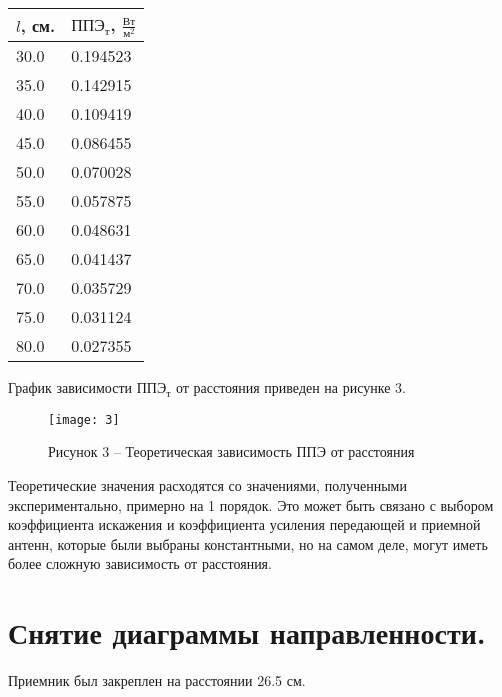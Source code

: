 \begin{longtable}{|p{7.5cm}|p{7.5cm}|}
    \hline
    $l$, см. & $\text{ППЭ}_{\text{т}}$, $\frac{\text{Вт}}{\text{м}^2}$ \\\hline
    30.0     & 0.194523                                                \\\hline
    35.0     & 0.142915                                                \\\hline
    40.0     & 0.109419                                                \\\hline
    45.0     & 0.086455                                                \\\hline
    50.0     & 0.070028                                                \\\hline
    55.0     & 0.057875                                                \\\hline
    60.0     & 0.048631                                                \\\hline
    65.0     & 0.041437                                                \\\hline
    70.0     & 0.035729                                                \\\hline
    75.0     & 0.031124                                                \\\hline
    80.0     & 0.027355                                                \\\hline
\end{longtable}

График зависимости $\text{ППЭ}_{\text{т}}$ от расстояния приведен на рисунке 3.
\begin{figure}[H]
    \centering
    \texttt{[image: 3]}
    \caption*{Рисунок 3 -- Теоретическая зависимость ППЭ от расстояния}
    \label{fig:3}
\end{figure}

Теоретические значения расходятся со значениями, полученными экспериментально, примерно
на 1 порядок.
Это может быть связано с выбором коэффициента искажения и коэффициента усиления
передающей и приемной антенн, которые были выбраны константными, но
на самом деле, могут иметь более сложную зависимость от расстояния.

\section*{Снятие диаграммы направленности.}
Приемник был закреплен на расстоянии 26.5 см.

